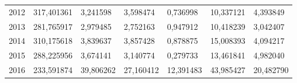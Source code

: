 \begin{table}
\begin{tabular}{p{1cm}p{2cm}p{2cm}p{2cm}p{2cm}p{2cm}p{2cm}}
 2012 &                            317,401361 &     3,241598 &          3,598474 &  0,736998 & 10,337121 &                            4,393849 \\
 2013 &                            281,765917 &     2,979485 &          2,752163 &  0,947912 & 10,418239 &                            3,042407 \\
 2014 &                            310,175618 &     3,839637 &          3,857428 &  0,878875 & 15,008393 &                            4,094217 \\
 2015 &                            288,225956 &     3,674141 &          3,140774 &  0,279733 & 13,461841 &                            4,982040 \\
 2016 &                            233,591874 &    39,806262 &         27,160412 & 12,391483 & 43,985427 &                           20,482790 \\
\bottomrule
\end{tabular}
\end{table}
